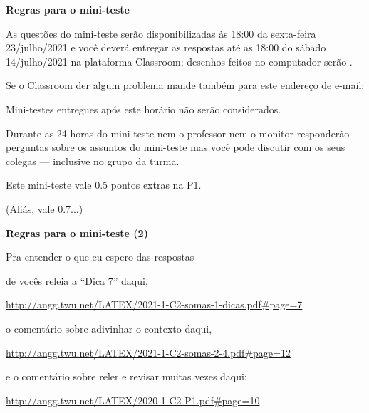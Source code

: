 \documentclass[oneside,12pt]{article}
\begin{document}
\newpage




{\bf Regras para o mini-teste}


As questões do mini-teste serão disponibilizadas às 18:00 da
sexta-feira 23/julho/2021 e você deverá entregar as respostas
 até as 18:00 do sábado 14/julho/2021 na
plataforma Classroom; dese\-nhos feitos no computador serão
.

Se o Classroom der algum problema mande também para este endereço de
e-mail:

\ssk


\ssk

Mini-testes entregues após este horário não serão considerados.

Durante as 24 horas do mini-teste nem o professor nem o monitor
responderão perguntas sobre os assuntos do mini-teste mas você pode
discutir com os seus colegas --- inclusive no grupo da turma.

Este mini-teste vale 0.5 pontos extras na P1.

\ssk

(Aliás, vale 0.7...)

\newpage

{\bf Regras para o mini-teste (2)}

\msk

Pra entender o que eu espero das respostas

de vocês releia a ``Dica 7'' daqui,

{\footnotesize

\url{http://angg.twu.net/LATEX/2021-1-C2-somas-1-dicas.pdf#page=7}
}

\msk

o comentário sobre adivinhar o contexto daqui,

{\footnotesize

\url{http://angg.twu.net/LATEX/2021-1-C2-somas-2-4.pdf#page=12}

}

\msk

e o comentário sobre reler e revisar muitas vezes daqui:

{\footnotesize

\url{http://angg.twu.net/LATEX/2020-1-C2-P1.pdf#page=10}

}
\end{document}
